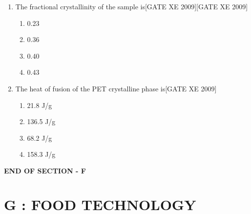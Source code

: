 \documentclass[journal,12pt,onecolumn]{IEEEtran}
\theoremstyle{remark}
\begin{document}
\begin{enumerate}[label=\textbf{Q.\arabic*.}, resume, wide=0pt, leftmargin=*]

\item The fractional crystallinity of the sample is\hfill[GATE XE 2009]\hfill[GATE XE 2009]
\begin{multicols}{2}
\begin{enumerate}
\item 0.23
\item 0.36
\item 0.40
\item 0.43
\end{enumerate}
\end{multicols}

\item The heat of fusion of the PET crystalline phase is\hfill[GATE XE 2009]
\begin{multicols}{2}
\begin{enumerate}
\item 21.8 J/g
\item 136.5 J/g
\item 68.2 J/g
\item 158.3 J/g
\end{enumerate}
\end{multicols}
\end{enumerate}


\vspace{1em}
\centerline{\textbf{END OF SECTION - F}}
\clearpage
\section*{G : FOOD TECHNOLOGY}
\end{document}
